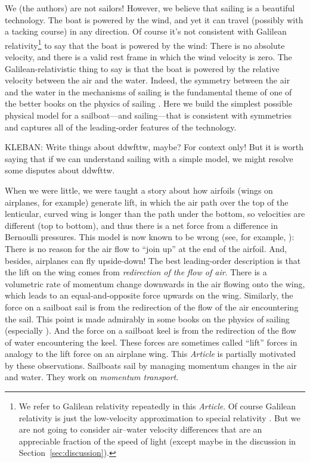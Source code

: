 \documentclass[letterpaper]{article}
\newcommand{\documentname}{\textsl{Article}}
\newcommand{\secref}[1]{Section~\ref{#1}}
\begin{document}
We (the authors) are not sailors!
However, we believe that sailing is a beautiful technology.
The boat is powered by the wind, and yet it can travel (possibly with a tacking course) in any direction.
Of course it's not consistent with Galilean relativity\footnote{We refer to Galilean relativity repeatedly in this \documentname.
Of course Galilean relativity is just the low-velocity approximation to special relativity \cite{sr}.
But we are not going to consider air--water velocity differences that are an appreciable fraction of the speed of light (except maybe in the discussion in \secref{sec:discussion}).} to say that the boat is powered by the wind:
There is no absolute velocity, and there is a valid rest frame in which the wind velocity is zero.
The Galilean-relativistic thing to say is that the boat is powered by the relative velocity between the air and the water.
Indeed, the symmetry between the air and the water in the mechanisms of sailing is the fundamental theme of one of the better books on the physics of sailing \cite{symmetry}.
Here we build the simplest possible physical model for a sailboat---and sailing---that is consistent with symmetries and captures all of the leading-order features of the technology.

KLEBAN: Write things about ddwfttw, maybe? For context only! But it is worth saying that if we can understand sailing with a simple model, we might resolve some disputes about ddwfttw.

When we were little, we were taught a story about how airfoils (wings on airplanes, for example) generate lift, in which the air path over the top of the lenticular, curved wing is longer than the path under the bottom, so velocities are different (top to bottom), and thus there is a net force from a difference in Bernoulli pressures.
This model is now known to be wrong (see, for example, \cite{lift}):
There is no reason for the air flow to ``join up'' at the end of the airfoil.
And, besides, airplanes can fly upside-down!
The best leading-order description is that the lift on the wing comes from \emph{redirection of the flow of air}.
There is a volumetric rate of momentum change downwards in the air flowing onto the wing, which leads to an equal-and-opposite force upwards on the wing.
Similarly, the force on a sailboat sail is from the redirection of the flow of the air encountering the sail.
This point is made admirably in some books on the physics of sailing (especially \cite{sails}).
And the force on a sailboat keel is from the redirection of the flow of water encountering the keel.
These forces are sometimes called ``lift'' forces in analogy to the lift force on an airplane wing.
This \documentname{} is partially motivated by these observations.
Sailboats sail by managing momentum changes in the air and water.
They work on \emph{momentum transport}.
\end{document}
